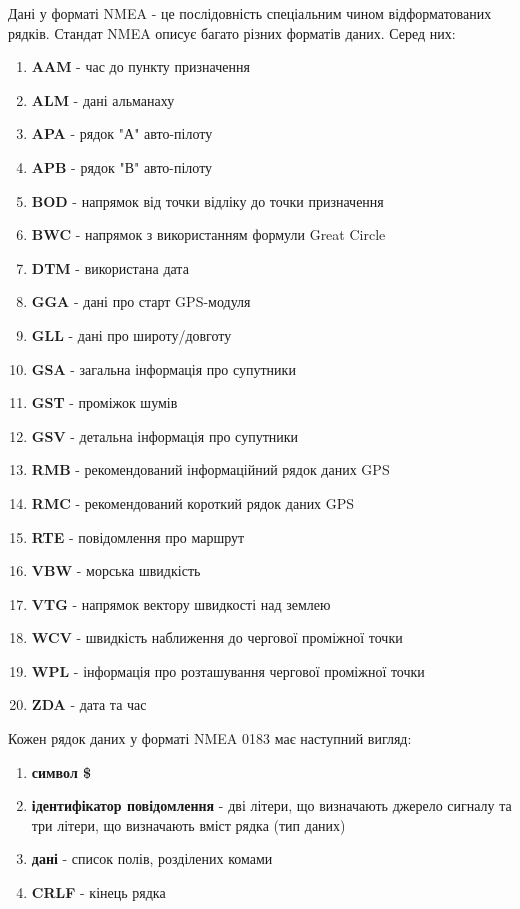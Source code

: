 \documentclass[simple,a4paper,14pt,ukrainian,utf8]{eskdtext}
\begin{document}
    Дані у форматі NMEA - це послідовність спеціальним чином відформатованих рядків. Стандат NMEA описує багато різних  форматів даних. Серед них:
    
    \begin{enumerate}
    	\item \textbf{AAM} - час до пункту призначення
        \item \textbf{ALM} - дані альманаху
        \item \textbf{APA} - рядок "А" авто-пілоту
        \item \textbf{APB} - рядок "В" авто-пілоту
        \item \textbf{BOD} - напрямок від точки відліку до точки призначення
        \item \textbf{BWC} - напрямок з використанням формули Great Circle
        \item \textbf{DTM} - використана дата
        \item \textbf{GGA} - дані про старт GPS-модуля
        \item \textbf{GLL} - дані про широту/довготу
        \item \textbf{GSA} - загальна інформація про супутники
        \item \textbf{GST} - проміжок шумів
        \item \textbf{GSV} - детальна інформація про супутники
        \item \textbf{RMB} - рекомендований інформаційний рядок даних GPS
        \item \textbf{RMC} - рекомендований короткий рядок даних GPS
        \item \textbf{RTE} - повідомлення про маршрут
        \item \textbf{VBW} - морська швидкість
        \item \textbf{VTG} - напрямок вектору швидкості над землею
        \item \textbf{WCV} - швидкість наближення до чергової проміжної точки
        \item \textbf{WPL} - інформація про розташування чергової проміжної точки
        \item \textbf{ZDA} - дата та час
    \end{enumerate}
    
    Кожен рядок даних у форматі NMEA 0183 має наступний вигляд:
    
    \begin{enumerate}
    	\item \textbf{символ \$}
		\item \textbf{ідентифікатор повідомлення} - дві літери, що визначають джерело сигналу та три літери, що визначають вміст рядка (тип даних)
		\item \textbf{дані} - список полів, розділених комами
		\item \textbf{CRLF} - кінець рядка
    \end{enumerate}
    
\end{document}
